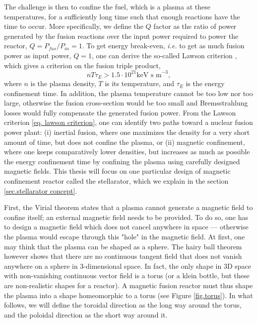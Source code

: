 \documentclass[my_thesis.tex]{subfiles}
\begin{document}
The challenge is then to confine the fuel, which is a plasma at these temperatures, for a sufficiently long time such that enough reactions have the time to occur. More specifically, we define the $Q$ factor as the ratio of power generated by the fusion reactions over the input power required to power the reactor, $Q=P_{fus}/P_{in}=1$. To get energy break-even, \textit{i.e.} to get as much fusion power as input power, $Q=1$, one can derive the so-called Lawson criterion \citep{lawsonCriteriaPowerProducing1957}, which gives a criterion on the fusion triple product,
\begin{equation}
    nT\tau_E > 1.5\cdot 10^{21}\text{keV s m}^{-3}, \label{eq. lawson criterion}
\end{equation} 
where $n$ is the plasma density, $T$ is its temperature, and $\tau_E$ is the energy confinement time. In addition, the plasma temperature cannot be too low nor too large, otherwise the fusion cross-section would be too small and Bremsstrahlung losses would fully compensate the generated fusion power. From the Lawson criterion \ref{eq. lawson criterion}, one can identify two paths toward a nuclear fusion power plant: (i) inertial fusion, where one maximizes the density for a very short amount of time, but does not confine the plasma, or (ii) magnetic confinement, where one keeps comparatively lower densities, but increases as much as possible the energy confinement time by confining the plasma using carefully designed magnetic fields. This thesis will focus on one particular design of magnetic confinement reactor called the stellarator, which we explain in the section \ref{sec.stellarator concept}.

First, the Virial theorem \citep{Freidberg2014} states that a plasma cannot generate a magnetic field to confine itself; an external magnetic field needs to be provided. To do so, one has to design a magnetic field which does not cancel anywhere in space --- otherwise the plasma would escape through this "hole" in the magnetic field. At first, one may think that the plasma can be shaped as a sphere. The hairy ball theorem \citep{Renteln2013-uu} however shows that there are no continuous tangent field that does not vanish anywhere on a sphere in 3-dimensional space. In fact, the only shape in 3D space with non-vanishing continuous vector field is a torus (or a klein bottle, but these are non-realistic shapes for a reactor). A magnetic fusion reactor must thus shape the plasma into a shape homeomorphic to a torus (see Figure \ref{fig.torus}).  In what follows, we will define the toroidal direction as the long way around the torus, and the poloidal direction as the short way around it.
\end{document}
